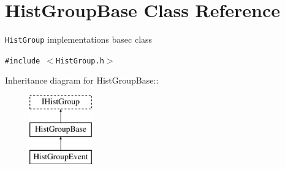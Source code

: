 \hypertarget{classHistGroupBase}{
\section{Hist\-Group\-Base Class Reference}
\label{classHistGroupBase}
}
{\tt Hist\-Group} implementations basec class  


{\tt \#include $<$Hist\-Group.h$>$}

Inheritance diagram for Hist\-Group\-Base::\begin{figure}[H]
\begin{center}
\leavevmode
\includegraphics[height=3cm]{classHistGroupBase}
\end{center}
\end{figure}
